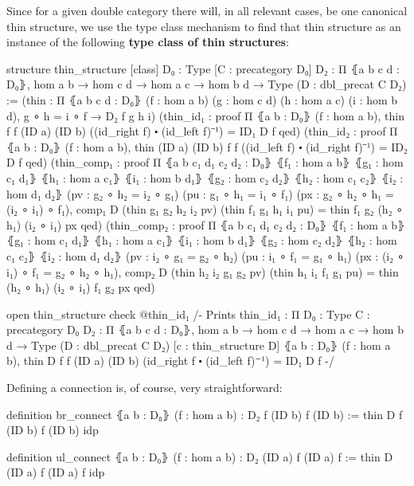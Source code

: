 Since for a given double category there will, in all relevant cases, be one
canonical thin structure, we use the type class mechanism to find that thin
structure as an instance of the following \textbf{type class of thin structures}:
\begin{leancodebr}
structure thin_structure [class] {D₀ : Type} [C : precategory D₀]
    {D₂ : Π ⦃a b c d : D₀⦄, hom a b → hom c d → hom a c → hom b d → Type}
    (D : dbl_precat C D₂) :=
  (thin : Π ⦃a b c d : D₀⦄
    (f : hom a b) (g : hom c d) (h : hom a c) (i : hom b d), g ∘ h = i ∘ f
    → D₂ f g h i)
  (thin_id₁ : proof Π ⦃a b : D₀⦄ (f : hom a b),
    thin f f (ID a) (ID b) ((id_right f) ⬝ (id_left f)⁻¹) = ID₁ D f qed)
  (thin_id₂ : proof Π ⦃a b : D₀⦄ (f : hom a b),
    thin (ID a) (ID b) f f ((id_left f) ⬝ (id_right f)⁻¹) = ID₂ D f qed)
  (thin_comp₁ : proof Π ⦃a b c₁ d₁ c₂ d₂ : D₀⦄
    ⦃f₁ : hom a b⦄ ⦃g₁ : hom c₁ d₁⦄ ⦃h₁ : hom a c₁⦄ ⦃i₁ : hom b d₁⦄
    ⦃g₂ : hom c₂ d₂⦄ ⦃h₂ : hom c₁ c₂⦄ ⦃i₂ : hom d₁ d₂⦄
    (pv : g₂ ∘ h₂ = i₂ ∘ g₁) (pu : g₁ ∘ h₁ = i₁ ∘ f₁)
    (px : g₂ ∘ h₂ ∘ h₁ = (i₂ ∘ i₁) ∘ f₁),
    comp₁ D (thin g₁ g₂ h₂ i₂ pv) (thin f₁ g₁ h₁ i₁ pu)
    = thin f₁ g₂ (h₂ ∘ h₁) (i₂ ∘ i₁) px qed)
  (thin_comp₂ : proof Π ⦃a b c₁ d₁ c₂ d₂ : D₀⦄
    ⦃f₁ : hom a b⦄ ⦃g₁ : hom c₁ d₁⦄ ⦃h₁ : hom a c₁⦄ ⦃i₁ : hom b d₁⦄
    ⦃g₂ : hom c₂ d₂⦄ ⦃h₂ : hom c₁ c₂⦄ ⦃i₂ : hom d₁ d₂⦄
    (pv : i₂ ∘ g₁ = g₂ ∘ h₂) (pu : i₁ ∘ f₁ = g₁ ∘ h₁)
    (px : (i₂ ∘ i₁) ∘ f₁ = g₂ ∘ h₂ ∘ h₁),
    comp₂ D (thin h₂ i₂ g₁ g₂ pv) (thin h₁ i₁ f₁ g₁ pu)
    = thin (h₂ ∘ h₁) (i₂ ∘ i₁) f₁ g₂ px qed)

open thin_structure
check @thin_id₁ /- Prints
  thin_id₁ :
  Π {D₀ : Type} {C : precategory D₀}
    {D₂ : Π ⦃a b c d : D₀⦄, hom a b → hom c d → hom a c → hom b d → Type}
    (D : dbl_precat C D₂) [c : thin_structure D] ⦃a b : D₀⦄ (f : hom a b),
        thin D f f (ID a) (ID b) (id_right f ⬝ (id_left f)⁻¹) = ID₁ D f -/
\end{leancodebr}

Defining a connection is, of course, very straightforward:
\begin{leancode}
definition br_connect ⦃a b : D₀⦄ (f : hom a b) : D₂ f (ID b) f (ID b) :=
thin D f (ID b) f (ID b) idp

definition ul_connect ⦃a b : D₀⦄ (f : hom a b) : D₂ (ID a) f (ID a) f :=
thin D (ID a) f (ID a) f idp
\end{leancode}

